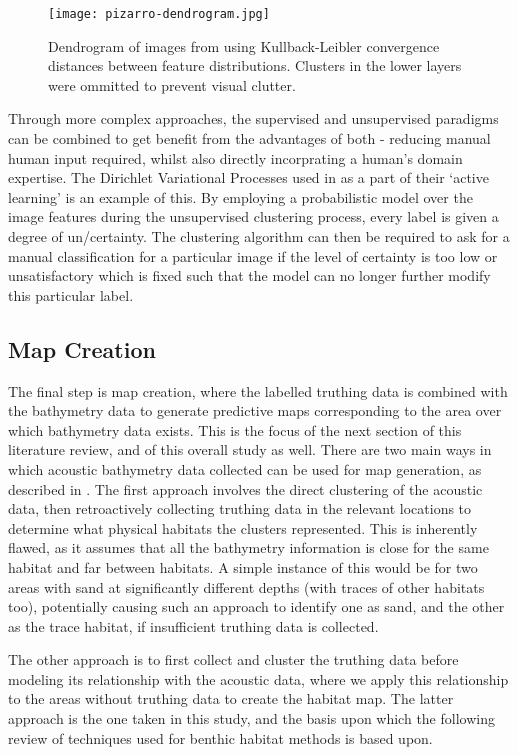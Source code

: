 \begin{figure}[H]
    \texttt{[image: pizarro-dendrogram.jpg]}
    \caption{Dendrogram of images from  \citet{pizarro09} using Kullback-Leibler convergence distances between feature distributions. Clusters in the lower layers were ommitted to prevent visual clutter.}
    \label{fig:p-dendrogram}
\end{figure}

Through more complex approaches, the supervised and unsupervised paradigms can be combined to get benefit from the advantages of both - reducing manual human input required, whilst also directly incorprating a human's domain expertise. The Dirichlet Variational Processes used in \citep{friedman11} as a part of their `active learning' is an example of this. By employing a probabilistic model over the image features during the unsupervised clustering process, every label is given a degree of un/certainty. The clustering algorithm can then be required to ask for a manual classification for a particular image if the level of certainty is too low or unsatisfactory which is fixed such that the model can no longer further modify this particular label.

\subsection{Map Creation}
The final step is map creation, where the labelled truthing data is combined with the bathymetry data to generate predictive maps corresponding to the area over which bathymetry data exists. This is the focus of the next section of this literature review, and of this overall study as well. There are two main ways in which acoustic bathymetry data collected can be used for map generation, as described in \citet{ahsan11}. The first approach involves the direct clustering of the acoustic data, then retroactively collecting truthing data in the relevant locations to determine what physical habitats the clusters represented. This is inherently flawed, as it assumes that all the bathymetry information is close for the same habitat and far between habitats. A simple instance of this would be for two areas with sand at significantly different depths (with traces of other habitats too), potentially causing such an approach to identify one as sand, and the other as the trace habitat, if insufficient truthing data is collected. 

The other approach is to first collect and cluster the truthing data before modeling its relationship with the acoustic data, where we apply this relationship to the areas without truthing data to create the habitat map. The latter approach is the one taken in this study, and the basis upon which the following review of techniques used for benthic habitat methods is based upon.

